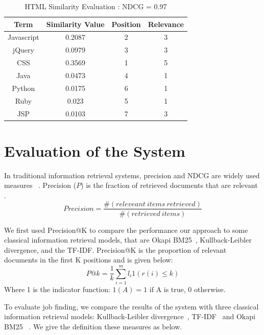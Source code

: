 \begin{table}
\centering
\caption{ HTML Similarity Evaluation : NDCG = 0.97 }
\begin{tabular}{ | c | c | c  | c |  }
 \hline
    Term      &  Similarity Value  &  Position   & Relevance     \\  \hline
  Javascript   &  0.2087           &      2      &   3        \\
     jQuery    &  0.0979           &      3      &   3         \\
     CSS     &  0.3569             &      1      &   5   \\
     Java    &  0.0473             &      4      &   1   \\
    Python   &  0.0175             &      6      &   1   \\
     Ruby    &  0.023              &      5      &   1    \\
     JSP     &  0.0103             &      7      &   3    \\
 \hline
\end{tabular}
\label{tab:simcompare2}
\end{table}


\section{Evaluation of the System}

In traditional information retrieval systems, precision and NDCG are widely used measures ~\cite{manning2008introduction}. Precision ($P$) is the fraction of retrieved documents that are relevant .
       $$  Precision =  \frac{ \#(releveant~items~ retrieved)}{ \#(retrieved~items)}$$

We first used Precision@K to compare the performance our approach to some classical information retrieval models, that are Okapi BM25~\cite{robertson2009probabilistic}, Kullback-Leibler divergence, and the TF-IDF. Precision@K is the proportion of relevant documents in the first K positions and is given below:
$$ P@k = \frac{1}{k} \sum^m_{i=1} l_i 1 \left(  r(i) \leq k  \right )  $$
Where 1 is the indicator function: $1(A) = 1$ if A is true, 0 otherwise.

To evaluate job finding, we compare the results of the system with three classical information retrieval models: Kullback-Leibler divergence~\cite{zhai2008statistical},  TF-IDF~\cite{manning2008introduction} and Okapi BM25 ~\cite{robertson1995okapi}. We give the definition these measures as below.

